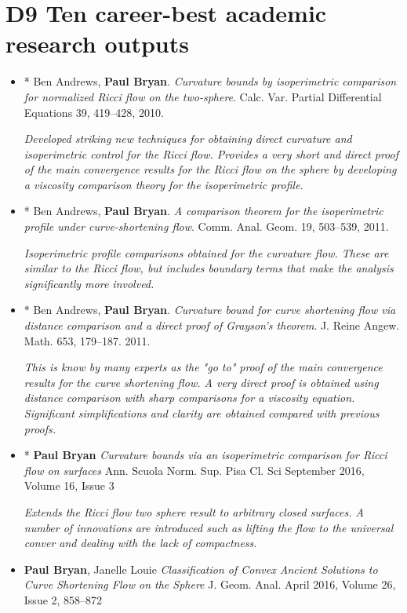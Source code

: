 \documentclass[12pt]{article}
\author{Paul Bryan}
\date{}
\title{}
\begin{document}
\section*{D9 Ten career-best academic research outputs}
\label{sec:org61b3fe2}

\begin{itemize}
\item * Ben Andrews, \textbf{Paul Bryan}. \emph{Curvature bounds by isoperimetric comparison for normalized Ricci flow on the two-sphere}. Calc. Var. Partial Differential Equations 39, 419--428, 2010.

\emph{Developed striking new techniques for obtaining direct curvature and isoperimetric control for the Ricci flow. Provides a very short and direct proof of the main convergence results for the Ricci flow on the sphere by developing a viscosity comparison theory for the isoperimetric profile.}

\item * Ben Andrews, \textbf{Paul Bryan}. \emph{A comparison theorem for the isoperimetric profile under curve-shortening flow}. Comm. Anal. Geom. 19, 503--539, 2011.

\emph{Isoperimetric profile comparisons obtained for the curvature flow. These are similar to the Ricci flow, but includes boundary terms that make the analysis significantly more involved.}

\item * Ben Andrews, \textbf{Paul Bryan}. \emph{Curvature bound for curve shortening flow via distance comparison and a direct proof of Grayson's theorem}. J. Reine Angew. Math. 653, 179--187. 2011.

\emph{This is know by many experts as the "go to" proof of the main convergence results for the curve shortening flow. A very direct proof is obtained using distance comparison with sharp comparisons for a viscosity equation. Significant simplifications and clarity are obtained compared with previous proofs.}

\item * \textbf{Paul Bryan} \emph{Curvature bounds via an isoperimetric comparison for Ricci flow on surfaces} Ann. Scuola Norm. Sup. Pisa Cl. Sci September 2016, Volume 16, Issue 3

\emph{Extends the Ricci flow two sphere result to arbitrary closed surfaces. A number of innovations are introduced such as lifting the flow to the universal conver and dealing with the lack of compactness.}

\item \textbf{Paul Bryan}, Janelle Louie \emph{Classification of Convex Ancient Solutions to Curve Shortening Flow on the Sphere} J. Geom. Anal. April 2016, Volume 26, Issue 2, 858--872


\end{itemize}
\end{document}
